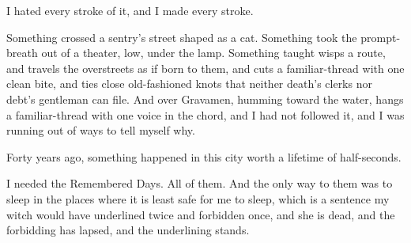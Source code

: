 I hated every stroke of it, and I made every stroke.

Something crossed a sentry's street shaped as a cat. Something took the prompt-breath out of a theater, low, under the lamp. Something taught wisps a route, and travels the overstreets as if born to them, and cuts a familiar-thread with one clean bite, and ties close old-fashioned knots that neither death's clerks nor debt's gentleman can file. And over Gravamen, humming toward the water, hangs a familiar-thread with one voice in the chord, and I had not followed it, and I was running out of ways to tell myself why.

Forty years ago, something happened in this city worth a lifetime of half-seconds.

I needed the Remembered Days. All of them. And the only way to them was to sleep in the places where it is least safe for me to sleep, which is a sentence my witch would have underlined twice and forbidden once, and she is dead, and the forbidding has lapsed, and the underlining stands.
